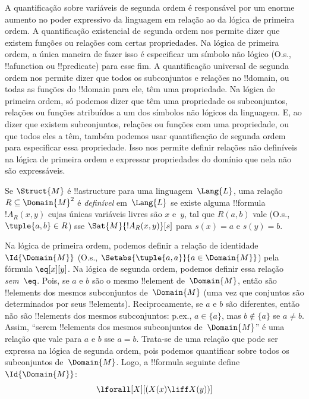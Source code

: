 \documentclass[../../../include/open-logic-section]{subfiles}
\begin{document}

\begin{explain}
A quantificação sobre variáveis de segunda ordem é responsável por um
enorme aumento no poder expressivo da linguagem em relação ao da lógica de
primeira ordem. A quantificação existencial de segunda ordem nos permite
dizer que existem funções ou relações com certas propriedades. Na lógica de
primeira ordem, a única maneira de fazer isso é especificar um símbolo não
lógico (O.s.\@, !!a{function} ou !!{predicate}) para esse fim. A
quantificação universal de segunda ordem nos permite dizer que todos os
subconjuntos e relações no !!{domain}, ou todas as funções do
!!{domain} para ele, têm uma propriedade. Na lógica de primeira
ordem, só podemos dizer que têm uma propriedade os subconjuntos, relações
ou funções atribuídos a um dos símbolos não lógicos da linguagem. E, ao
dizer que existem subconjuntos, relações ou funções com uma propriedade,
ou que todos eles a têm, também podemos usar quantificação de segunda ordem
para especificar essa propriedade. Isso nos permite definir relações não
definíveis na lógica de primeira ordem e expressar propriedades do domínio
que nela não são expressáveis.
\end{explain}

\begin{defn}
Se $\Struct{M}$ é !!a{structure} para uma linguagem~$\Lang{L}$, uma
relação~$R \subseteq \Domain{M}^2$ é \emph{definível} em~$\Lang{L}$ se
existe alguma !!{formula}~$!A_R(x, y)$ cujas únicas variáveis livres são
$x$ e~$y$, tal que $R(a, b)$ vale (O.s.\@, $\tuple{a,b} \in R$) sse
$\Sat{M}{!A_R(x, y)}[s]$ para $s(x) = a$ e $s(y) = b$.
\end{defn}

\begin{ex}
Na lógica de primeira ordem, podemos definir a relação de identidade
~$\Id{\Domain{M}}$ (O.s.\@, $\Setabs{\tuple{a,a}}{a \in
  \Domain{M}}$) pela fórmula $\eq[x][y]$. Na lógica de segunda ordem,
podemos definir essa relação \emph{sem~$\eq$}. Pois, se $a$ e $b$ são o
mesmo !!{element} de~$\Domain{M}$, então são !!{element}s dos mesmos
subconjuntos de~$\Domain{M}$ (uma vez que conjuntos são determinados por
seus !!{element}s). Reciprocamente, se $a$ e $b$ são diferentes, então não
são !!{element}s dos mesmos subconjuntos: p.ex., $a \in \{a\}$, mas
$b \notin \{a\}$ se $a \neq b$. Assim, ``serem !!{element}s dos mesmos
subconjuntos de~$\Domain{M}$'' é uma relação que vale para $a$ e $b$ sse
$a = b$. Trata-se de uma relação que pode ser expressa na lógica de segunda
ordem, pois podemos quantificar sobre todos os subconjuntos de~$\Domain{M}$.
Logo, a !!{formula} seguinte define $\Id{\Domain{M}}$:
\[
\lforall[X][(X(x) \liff X(y))]
\]
\end{ex}
\end{document}
